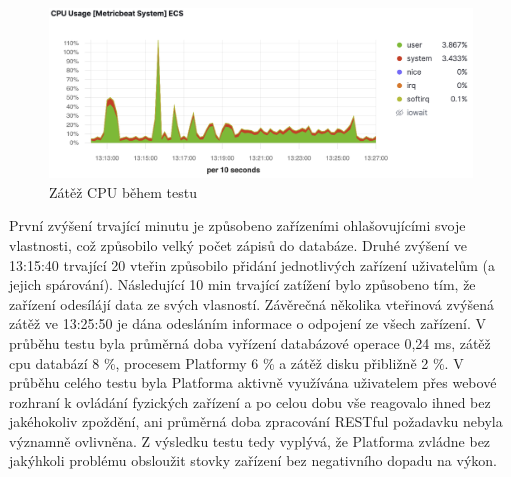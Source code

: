 \begin{figure}[htbp]
    \centering
    \includegraphics[width=\textwidth]{img/cpu_usage.png}
    \caption{\label{cpu-usage}Zátěž CPU během testu}
\end{figure}

První zvýšení trvající minutu je způsobeno zařízeními ohlašovujícími svoje vlastnosti, což způsobilo velký počet zápisů do databáze. Druhé zvýšení ve 13:15:40 trvající 20 vteřin způsobilo přidání jednotlivých zařízení uživatelům (a jejich spárování). Následující 10 min trvající zatížení bylo způsobeno tím, že zařízení odesílájí data ze svých vlasností. Závěrečná několika vteřinová zvýšená zátěž ve 13:25:50 je dána odesláním informace o odpojení ze všech zařízení. V průběhu testu byla průměrná doba vyřízení databázové operace 0,24 ms, zátěž cpu databází 8 \%, procesem Platformy 6 \% a zátěž disku přibližně 2 \%. V průběhu celého testu byla Platforma aktivně využívána uživatelem přes webové rozhraní k ovládání fyzických zařízení a po celou dobu vše reagovalo ihned bez jakéhokoliv zpoždění, ani průměrná doba zpracování RESTful požadavku nebyla významně ovlivněna. Z výsledku testu tedy vyplývá, že Platforma zvládne bez jakýhkoli problému obsloužit stovky zařízení bez negativního dopadu na výkon.




